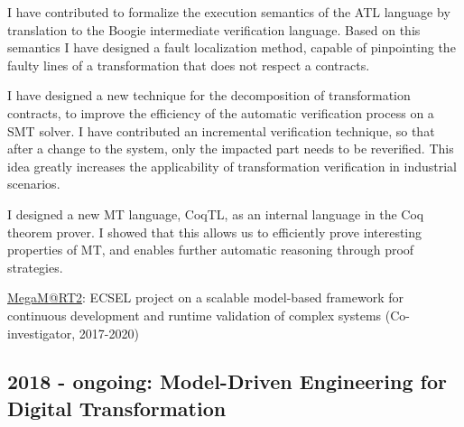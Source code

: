 \documentclass[10pt,a4paper]{article}
\begin{document}
I have contributed to formalize the execution semantics of the ATL language by translation to the Boogie intermediate verification language. Based on this semantics I have designed a fault localization method, capable of pinpointing the faulty lines of a transformation that does not respect a contracts.

I have designed a new technique for the decomposition of transformation contracts, to improve the efficiency of the automatic verification process on a SMT solver. I have contributed an incremental verification technique, so that after a change to the system, only the impacted part needs to be reverified. This idea greatly increases the applicability of transformation verification in industrial scenarios. 

I designed a new MT language, CoqTL, as an internal language in the Coq theorem prover. I showed that this allows us to efficiently prove interesting properties of MT, and enables further automatic reasoning through proof strategies.  



\medskip
{\footnotesize
  \href{https://megamart2-ecsel.eu/}{MegaM@RT2}: ECSEL project on a
  scalable model-based framework for continuous development and runtime
  validation of complex systems (Co-investigator, 2017-2020)
}

\subsection{2018 - ongoing: Model-Driven Engineering for Digital Transformation}
\end{document}
